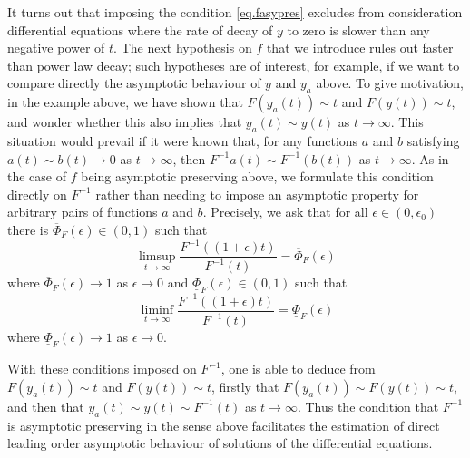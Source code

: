 \documentclass[a4paper,10pt,reqno]{amsart}
\numberwithin{equation}{section}
\theoremstyle{definition}
\theoremstyle{remark}
\DeclareMathOperator{\1}{\mathbbm 1}
\begin{document}
	It turns out that imposing the condition \eqref{eq.fasypres} excludes from consideration differential equations where the rate of decay of $y$ to zero is slower than any negative power of $t$. The next hypothesis on $f$ that we introduce rules out faster than power law decay; such  hypotheses are of interest, for example, if we want to compare directly the asymptotic behaviour of $y$ and $y_a$ above. To give motivation, in the example above, we have shown that  $F(y_a(t))\sim t$ and $F(y(t))\sim t$, and wonder whether this also implies that $y_a(t)\sim y(t)$ as $t\to\infty$. This situation would prevail if it were known that, for any functions $a$ and $b$ satisfying 
	$a(t)\sim b(t)\to 0$ as $t\to\infty$, then $F^{-1}{a(t)}\sim F^{-1}(b(t))$ as $t\to\infty$. As in the case of $f$ being asymptotic preserving above, we formulate this condition directly on $F^{-1}$ rather than needing to impose an asymptotic property for arbitrary pairs of functions $a$ and $b$. Precisely, we ask that for all $\epsilon\in (0,\epsilon_0)$ there is $\overline{\Phi}_F(\epsilon)\in (0,1)$ such that 
	\begin{equation} \label{eq.Finvasplimsup}
		\limsup_{t\to\infty} \frac{F^{-1}((1+\epsilon)t)}{F^{-1}(t)}=\overline{\Phi}_F(\epsilon)
	\end{equation}
	where  $\overline{\Phi}_F(\epsilon)\to 1$ as $\epsilon\to 0$ and $\underline{\Phi}_F(\epsilon)\in (0,1)$   such that 
	\begin{equation} \label{eq.Finvaspliminf}
		\liminf_{t\to\infty} \frac{F^{-1}((1+\epsilon)t)}{F^{-1}(t)}=\underline{\Phi}_F(\epsilon)
	\end{equation}
	where  $\underline{\Phi}_F(\epsilon)\to 1$ as $\epsilon\to 0$. 
	
	With these conditions imposed on $F^{-1}$, one is able to deduce from $F(y_a(t))\sim t$ and $F(y(t))\sim t$, firstly that $F(y_a(t))\sim F(y(t))\sim t$, and then that $y_a(t)\sim y(t)\sim F^{-1}(t)$ as $t\to\infty$. Thus the condition that $F^{-1}$ is asymptotic preserving in the sense above facilitates the estimation of direct leading order asymptotic behaviour of solutions of the differential equations. 
	
\end{document}
